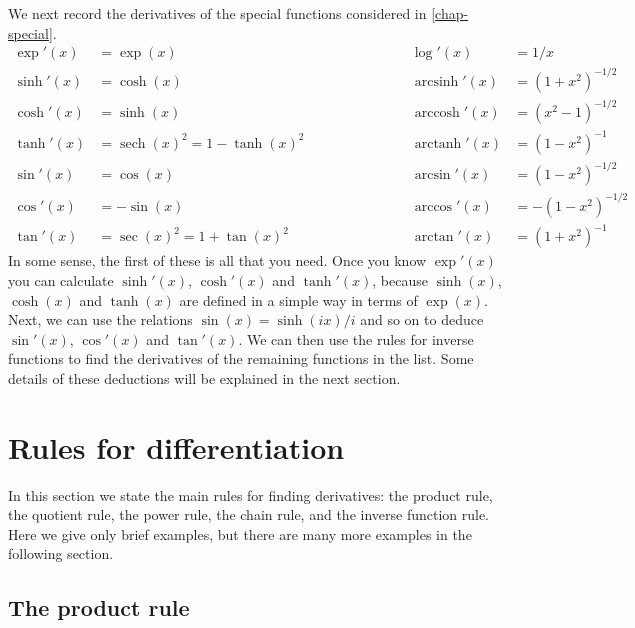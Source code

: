 \documentclass[a4paper]{book}
\newcommand{\sech}     {\operatorname{sech}}
\newcommand{\arcsinh}  {\operatorname{arcsinh}}
\newcommand{\arccosh}  {\operatorname{arccosh}}
\newcommand{\arctanh}  {\operatorname{arctanh}}
\renewcommand{\:}{\colon}
\theoremstyle{definition}
\begin{document}
We next record the derivatives of the special functions considered
in \autoref{chap-special}.
\[ \begin{array}{rlcrl}
 \exp'(x)     &= \exp(x) &\hspace{6em}&
 \log'(x)     &= 1/x \\
 \sinh'(x)    &= \cosh(x) &&
 \arcsinh'(x) &= (1+x^2)^{-1/2} \\
 \cosh'(x)    &= \sinh(x) &&
 \arccosh'(x) &= (x^2-1)^{-1/2} \\
 \tanh'(x)    &= \sech(x)^2 = 1 - \tanh(x)^2 &&
 \arctanh'(x) &= (1-x^2)^{-1} \\
 \sin'(x)     &= \cos(x) &&
 \arcsin'(x)  &= (1-x^2)^{-1/2} \\
 \cos'(x)     &= -\sin(x) &&
 \arccos'(x)  &= -(1-x^2)^{-1/2} \\
 \tan'(x)     &= \sec(x)^2 = 1 + \tan(x)^2 &&
 \arctan'(x)  &= (1+x^2)^{-1}
\end{array} \]
In some sense, the first of these is all that you need.  Once you know
$\exp'(x)$ you can calculate $\sinh'(x)$, $\cosh'(x)$ and $\tanh'(x)$,
because $\sinh(x)$, $\cosh(x)$ and $\tanh(x)$ are defined in a simple
way in terms of $\exp(x)$.  Next, we can use the relations
$\sin(x)=\sinh(ix)/i$ and so on to deduce $\sin'(x)$, $\cos'(x)$ and
$\tan'(x)$.  We can then use the rules for inverse functions to find
the derivatives of the remaining functions in the list.  Some details
of these deductions will be explained in the next section.

\section{Rules for differentiation}
\label{sec-diff-rules}

In this section we state the main rules for finding derivatives:
the product rule, the quotient rule, the power rule, the chain rule,
and the inverse function rule.  Here we give only brief examples, but
there are many more examples in the following section.

\subsection{The product rule}
\label{subsec-rule-prod}
\end{document}
